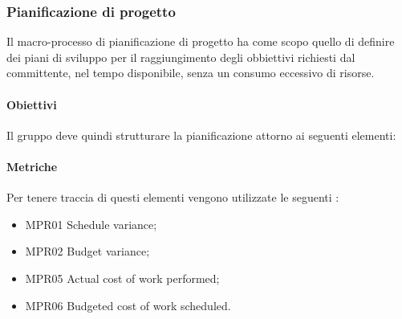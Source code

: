 \subsubsection{Pianificazione di progetto}
Il macro-processo di pianificazione di progetto ha come scopo quello di definire dei piani di sviluppo per il raggiungimento degli obbiettivi richiesti dal committente, nel tempo disponibile, senza un consumo eccessivo di risorse.

\paragraph{Obiettivi}
Il gruppo \gruppo{} deve quindi strutturare la pianificazione attorno ai seguenti elementi:

\paragraph{Metriche}%
Per tenere traccia di questi elementi vengono utilizzate le seguenti :
\begin{itemize}
\item MPR01 Schedule variance;
\item MPR02 Budget variance;
\item MPR05 Actual cost of work performed;
\item MPR06 Budgeted cost of work scheduled.

\end{itemize}

